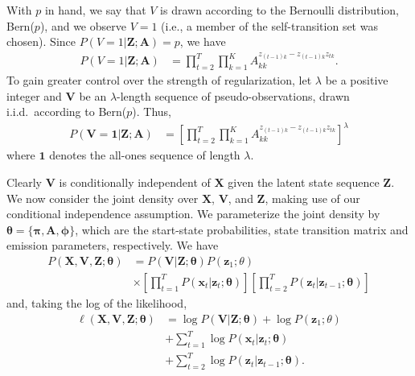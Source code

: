 \documentclass[letterpaper]{article}
\begin{document}
With $p$ in hand, we say that $V$ is drawn according to the Bernoulli distribution, Bern($p$), and we observe $V = 1$ (i.e., a member of the self-transition set was chosen). Since $P(V = 1|\mathbf{Z};\mathbf{A}) = p$, we have
\begin{align*}
    P(V = 1|\mathbf{Z}; \mathbf{A}) &= \prod^{T}_{t=2}\prod^{K}_{k=1}A_{kk}^{z_{(t-1)k} - z_{(t-1)k}z_{tk}}.
\end{align*}
To gain greater control over the strength of regularization, let $\lambda$ be a positive integer and $\mathbf{V}$ be an $\lambda$-length sequence of pseudo-observations, drawn i.i.d.\ according to Bern($p$). Thus, 
\begin{align*}
    P(\mathbf{V} = \mathbf{1}|\mathbf{Z}; \mathbf{A}) &= \left[\prod^{T}_{t=2}\prod^{K}_{k=1}A_{kk}^{z_{(t-1)k} - z_{(t-1)k}z_{tk}}\right]^\lambda
\end{align*}
where $\mathbf{1}$ denotes the all-ones sequence of length $\lambda$.

Clearly $\mathbf{V}$ is conditionally independent of $\mathbf{X}$ given the latent state sequence $\mathbf{Z}$. We now consider the joint density over $\mathbf{X}$, $\mathbf{V}$, and $\mathbf{Z}$, making use of our conditional independence assumption. We parameterize the joint density by $\mathbf{\theta} = \{\mathbf{\pi},\mathbf{A}, \mathbf{\phi}\}$, which are the start-state probabilities, state transition matrix and emission parameters, respectively. We have
\begin{align*}
    P(\mathbf{X}, \mathbf{V}, \mathbf{Z} ; \mathbf{\theta}) 
    &= P(\mathbf{V}|\mathbf{Z}; \mathbf{\theta}) P(\mathbf{z}_{1} ; \theta) \\
    &\times \left[\prod_{t=1}^{T}P(\mathbf{x}_t|\mathbf{z}_t; \mathbf{\theta})\right]\left[\prod_{t=2}^{T}P(\mathbf{z}_t|\mathbf{z}_{t-1}; \mathbf{\theta})\right]
\end{align*}
and, taking the log of the likelihood,
\begin{align*}
    \ell(\mathbf{X}, \mathbf{V}, \mathbf{Z} ; \mathbf{\theta}) 
    &= \log P(\mathbf{V}|\mathbf{Z}; \mathbf{\theta}) + \log P(\mathbf{z}_{1}; \theta) \\
    &+ \sum_{t=1}^{T}\log P(\mathbf{x}_t|\mathbf{z}_t; \mathbf{\theta}) \\
    &+ \sum_{t=2}^{T}\log P(\mathbf{z}_t|\mathbf{z}_{t-1};\mathbf{\theta}).
\end{align*}
\end{document}
